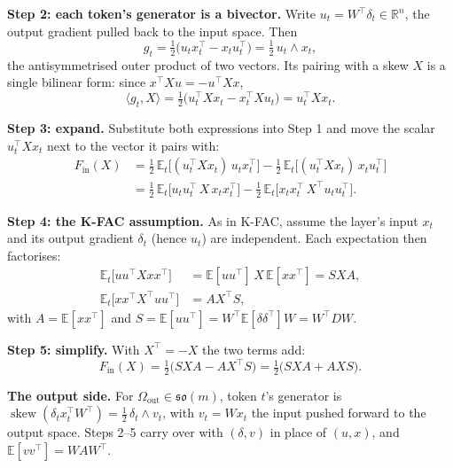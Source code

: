 \documentclass{article}
\begin{document}
\textbf{Step 2: each token's generator is a bivector.} Write \(u_t = W^\top \delta_t \in \mathbb{R}^n\), the
output gradient pulled back to the input space. Then
\[g_t = \tfrac12\big(u_t x_t^\top - x_t u_t^\top\big) = \tfrac12\, u_t \wedge x_t,\]
the antisymmetrised outer product of two vectors. Its pairing with a skew \(X\) is a single bilinear
form: since \(x^\top X u = -u^\top X x\),
\[\langle g_t, X\rangle = \tfrac12\big(u_t^\top X x_t - x_t^\top X u_t\big) = u_t^\top X x_t .\]

\textbf{Step 3: expand.} Substitute both expressions into Step 1 and move the scalar \(u_t^\top X x_t\) next to the
vector it pairs with:
\begin{align*}
F_{\mathrm{in}}(X) &= \tfrac12\,\mathbb{E}_t\big[(u_t^\top X x_t)\, u_t x_t^\top\big]
- \tfrac12\,\mathbb{E}_t\big[(u_t^\top X x_t)\, x_t u_t^\top\big] \\
&= \tfrac12\,\mathbb{E}_t\big[u_t u_t^\top\, X\, x_t x_t^\top\big]
- \tfrac12\,\mathbb{E}_t\big[x_t x_t^\top\, X^\top u_t u_t^\top\big].
\end{align*}

\textbf{Step 4: the K-FAC assumption.} As in K-FAC, assume the layer's input \(x_t\) and its output gradient
\(\delta_t\) (hence \(u_t\)) are independent. Each expectation then factorises:
\begin{align*}
\mathbb{E}_t\big[u u^\top X x x^\top\big] &= \mathbb{E}[u u^\top]\, X\, \mathbb{E}[x x^\top] = S X A, \\
\mathbb{E}_t\big[x x^\top X^\top u u^\top\big] &= A X^\top S,
\end{align*}
with \(A = \mathbb{E}[x x^\top]\) and \(S = \mathbb{E}[u u^\top] = W^\top \mathbb{E}[\delta\delta^\top] W = W^\top D W\).

\textbf{Step 5: simplify.} With \(X^\top = -X\) the two terms add:
\[F_{\mathrm{in}}(X) = \tfrac12\big(S X A - A X^\top S\big) = \tfrac12\big(S X A + A X S\big).\]

\textbf{The output side.} For \(\Omega_{\mathrm{out}} \in \mathfrak{so}(m)\), token \(t\)'s generator is
\(\operatorname{skew}(\delta_t x_t^\top W^\top) = \tfrac12\,\delta_t \wedge v_t\), with \(v_t = W x_t\) the input pushed
forward to the output space. Steps 2--5 carry over with \((\delta, v)\) in place of \((u, x)\), and
\(\mathbb{E}[v v^\top] = W A W^\top\).
\end{document}
